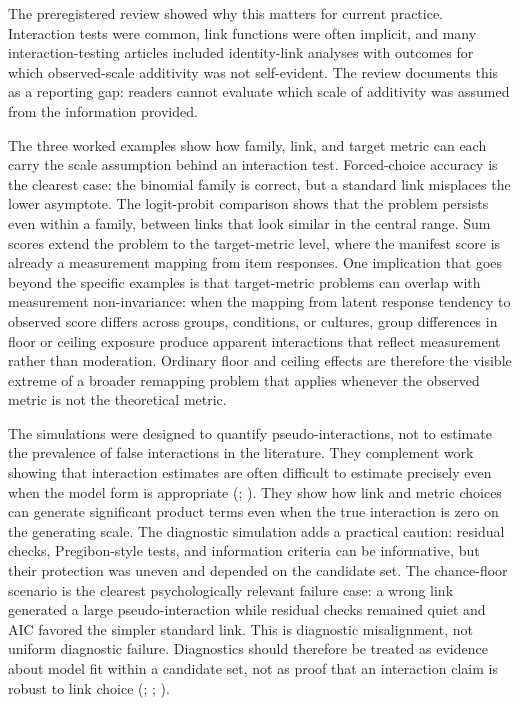 \documentclass[
  man,
  longtable,
  nolmodern,
  notxfonts,
  notimes,
  colorlinks=true,linkcolor=blue,citecolor=blue,urlcolor=blue]{apa7}
\begin{document}
The preregistered review showed why this matters for current practice.
Interaction tests were common, link functions were often implicit, and
many interaction-testing articles included identity-link analyses with
outcomes for which observed-scale additivity was not self-evident. The
review documents this as a reporting gap: readers cannot evaluate which
scale of additivity was assumed from the information provided.

The three worked examples show how family, link, and target metric can
each carry the scale assumption behind an interaction test.
Forced-choice accuracy is the clearest case: the binomial family is
correct, but a standard link misplaces the lower asymptote. The
logit-probit comparison shows that the problem persists even within a
family, between links that look similar in the central range. Sum scores
extend the problem to the target-metric level, where the manifest score
is already a measurement mapping from item responses. One implication
that goes beyond the specific examples is that target-metric problems
can overlap with measurement non-invariance: when the mapping from
latent response tendency to observed score differs across groups,
conditions, or cultures, group differences in floor or ceiling exposure
produce apparent interactions that reflect measurement rather than
moderation. Ordinary floor and ceiling effects are therefore the visible
extreme of a broader remapping problem that applies whenever the
observed metric is not the theoretical metric.

The simulations were designed to quantify pseudo-interactions, not to
estimate the prevalence of false interactions in the literature. They
complement work showing that interaction estimates are often difficult
to estimate precisely even when the model form is appropriate
(;
). They show how link
and metric choices can generate significant product terms even when the
true interaction is zero on the generating scale. The diagnostic
simulation adds a practical caution: residual checks, Pregibon-style
tests, and information criteria can be informative, but their protection
was uneven and depended on the candidate set. The chance-floor scenario
is the clearest psychologically relevant failure case: a wrong link
generated a large pseudo-interaction while residual checks remained
quiet and AIC favored the simpler standard link. This is diagnostic
misalignment, not uniform diagnostic failure. Diagnostics should
therefore be treated as evidence about model fit within a candidate set,
not as proof that an interaction claim is robust to link choice
(;
;
).
\end{document}
